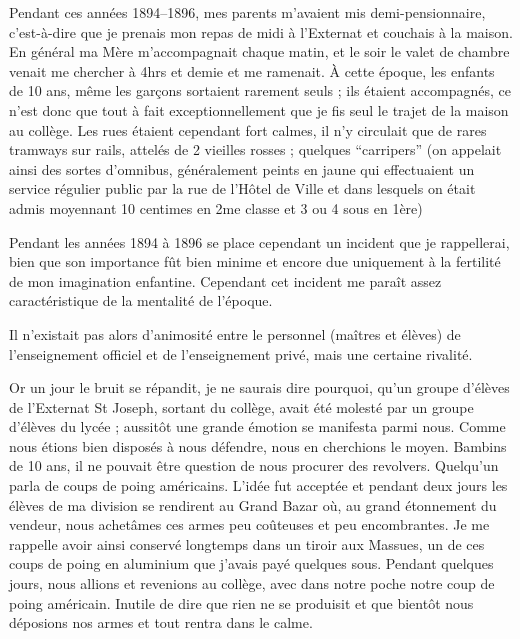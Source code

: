 \documentclass[11pt,a4paper]{report}
\begin{document}
Pendant ces années 1894--1896, mes parents m'avaient mis demi-pensionnaire, c'est-à-dire que je prenais mon repas de midi à l'Externat et couchais à la maison. En général ma Mère m'accompagnait chaque matin, et le soir le valet de chambre venait me chercher à 4hrs et demie et me ramenait. À cette époque, les enfants de 10 ans, même les garçons sortaient rarement seuls ; ils étaient accompagnés, ce n'est donc que tout à fait exceptionnellement que je fis seul le trajet de la maison au collège. Les rues étaient cependant fort calmes, il n'y circulait que de rares tramways sur rails, attelés de 2 vieilles rosses ; quelques ``carripers'' (on appelait ainsi des sortes d'omnibus, généralement peints en jaune qui effectuaient un service régulier public par la rue de l'Hôtel de Ville et dans lesquels on était admis moyennant 10 centimes en 2me classe et 3 ou 4 sous en 1ère)

Pendant les années 1894 à 1896 se place cependant un incident que je rappellerai, bien que son importance fût bien minime et encore due uniquement à la fertilité de mon imagination enfantine. Cependant cet incident me paraît assez caractéristique de la mentalité de l'époque.

Il n'existait pas alors d'animosité entre le personnel (maîtres et élèves) de l'enseignement officiel et de l'enseignement privé, mais une certaine rivalité.

Or un jour le bruit se répandit, je ne saurais dire pourquoi, qu'un groupe d'élèves de l'Externat St Joseph, sortant du collège, avait été molesté par un groupe d'élèves du lycée ; aussitôt une grande émotion se manifesta parmi nous. Comme nous étions bien disposés à nous défendre, nous en cherchions le moyen. Bambins de 10 ans, il ne pouvait être question de nous procurer des revolvers. Quelqu'un parla de coups de poing américains. L'idée fut acceptée et pendant deux jours les élèves de ma division se rendirent au Grand Bazar où, au grand étonnement du vendeur, nous achetâmes ces armes peu coûteuses et peu encombrantes. Je me rappelle avoir ainsi conservé longtemps dans un tiroir aux Massues, un de ces coups de poing en aluminium que j'avais payé quelques sous. Pendant quelques jours, nous allions et revenions au collège, avec dans notre poche notre coup de poing américain. Inutile de dire que rien ne se produisit et que bientôt nous déposions nos armes et tout rentra dans le calme.
\end{document}
